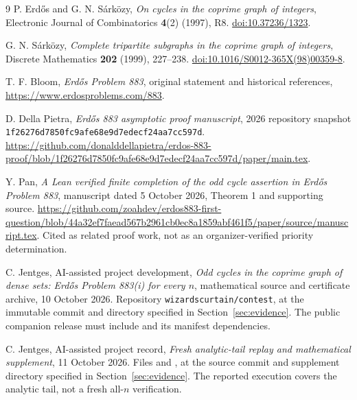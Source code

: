 \begin{thebibliography}{9}
P. Erd\H{o}s and G. N. S\'ark\"ozy,
\emph{On cycles in the coprime graph of integers},
Electronic Journal of Combinatorics \textbf{4}(2) (1997), R8.
\href{https://doi.org/10.37236/1323}{doi:10.37236/1323}.

G. N. S\'ark\"ozy,
\emph{Complete tripartite subgraphs in the coprime graph of integers},
Discrete Mathematics \textbf{202} (1999), 227--238.
\href{https://doi.org/10.1016/S0012-365X(98)00359-8}{doi:10.1016/S0012-365X(98)00359-8}.

T. F. Bloom, \emph{Erd\H{o}s Problem 883}, original statement and historical references,
\url{https://www.erdosproblems.com/883}.

D. Della Pietra, \emph{Erd\H{o}s 883 asymptotic proof manuscript},
2026 repository snapshot
\texttt{1f26276d7850fc9afe68e9d7edecf24aa7cc597d}.
\url{https://github.com/donalddellapietra/erdos-883-proof/blob/1f26276d7850fc9afe68e9d7edecf24aa7cc597d/paper/main.tex}.

Y. Pan, \emph{A Lean verified finite completion of the odd cycle assertion in Erd\H{o}s Problem 883},
manuscript dated 5 October 2026, Theorem 1 and supporting source.
\url{https://github.com/zoahdev/erdos883-first-question/blob/44a32ef7faead567b2961cb0ec8a1859abf461f5/paper/source/manuscript.tex}.
Cited as related proof work, not as an organizer-verified priority determination.

C. Jentges, AI-assisted project development,
\emph{Odd cycles in the coprime graph of dense sets: Erd\H{o}s Problem 883(i) for every $n$},
mathematical source and certificate archive, 10 October 2026.
Repository \texttt{wizardscurtain/contest}, at the immutable commit and directory
specified in Section~\ref{sec:evidence}. The public companion release must include
 and its manifest dependencies.

C. Jentges, AI-assisted project record,
\emph{Fresh analytic-tail replay and mathematical supplement},
11 October 2026. Files  and
, at the source commit and supplement
directory specified in Section~\ref{sec:evidence}. The reported execution covers
the analytic tail, not a fresh all-$n$ verification.
\end{thebibliography}
